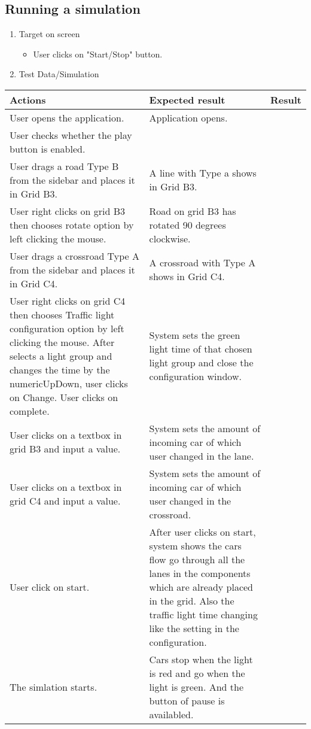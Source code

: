 \newpage 

\subsection{Running a simulation}

\begin{enumerate}

	\item Target on screen
	\begin{itemize}
		\item User clicks on "Start/Stop" button.
	\end{itemize}
	\item Test Data/Simulation
\end{enumerate}	
	\begin{tabularx}{\textwidth}{|X|X|p{2.5cm}|}\hline
		Actions & Expected result & Result \\\hline
		User opens the application.& Application opens. &  \pass \\\hline
		User checks whether the play button is enabled. & &  \pass \\\hline
		User drags a road Type B from the sidebar and places it in Grid B3. & A line with Type a shows in Grid B3. & \pass \\\hline
		User right clicks on grid B3 then chooses rotate option by left clicking the mouse. & Road on grid B3 has rotated 90 degrees clockwise. & \pass \\\hline
		User drags a crossroad Type A from the sidebar and places it in Grid C4. & A crossroad with Type A shows in Grid C4. & \pass \\\hline
		User right clicks on grid C4 then chooses Traffic light configuration  option by left clicking the mouse. After selects a light group and changes the time by the numericUpDown, user clicks on Change. User clicks on complete. & System sets the green light time of that chosen light group and close the configuration window.  & \pass \\\hline
		User clicks on a textbox in grid B3 and input a value. & System sets the amount of incoming car of which user changed in the lane. & \pass \\\hline
		User clicks on a textbox in grid C4 and input a value. & System sets the amount of incoming car of which user changed in the crossroad. & \pass \\\hline
		User click on start. & After user clicks on start, system shows the cars flow go through all the lanes in the components which are already placed in the grid. Also the traffic light time changing like the setting in the configuration. & \pass \\\hline
		The simlation starts. &	Cars stop when the light is red and go when the light is green. And the button of pause is availabled. & \pass \\\hline	
	\end{tabularx}


